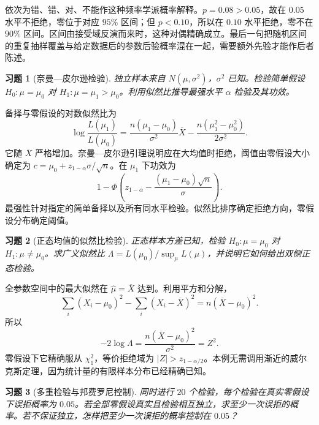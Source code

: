 \documentclass[UTF8,12pt,a4paper,fontset=fandol]{ctexart}
\newtheorem{exercise}{习题}[section]
\begin{document}
\begin{solve}\label{a:M-F-C10}依次为错、错、对、不能作这种频率学派概率解释。$p=0.08>0.05$，故在 $0.05$ 水平不拒绝，零位于对应 $95\%$ 区间；但 $p<0.10$，所以在 $0.10$ 水平拒绝，零不在 $90\%$ 区间。区间由接受域反演而来时，这种对偶精确成立。最后一句把随机区间的重复抽样覆盖与给定数据后的参数后验概率混在一起，需要额外先验才能作后者陈述。\end{solve}

\begin{exercise}[奈曼—皮尔逊检验]\label{q:B14.1}
独立样本来自 $N(\mu,\sigma^2)$，$\sigma^2$ 已知。检验简单假设 $H_0:\mu=\mu_0$ 对 $H_1:\mu=\mu_1>\mu_0$。利用似然比推导最强水平 $\alpha$ 检验及其功效。\par{}
\end{exercise}

\begin{solve}\label{a:B14.1}备择与零假设的对数似然比为\[\log\frac{L(\mu_1)}{L(\mu_0)}=\frac{n(\mu_1-\mu_0)}{\sigma^2}\overline X-\frac{n(\mu_1^2-\mu_0^2)}{2\sigma^2}.\]它随 $\overline X$ 严格增加。奈曼—皮尔逊引理说明应在大均值时拒绝，阈值由零假设大小确定为 $c=\mu_0+z_{1-\alpha}\sigma/\sqrt n$。在 $\mu_1$ 下功效为\[1-\Phi\left(z_{1-\alpha}-\frac{(\mu_1-\mu_0)\sqrt n}{\sigma}\right).\]最强性针对指定的简单备择以及所有同水平检验。似然比排序确定拒绝方向，零假设分布确定阈值。\end{solve}

\begin{exercise}[正态均值的似然比检验]\label{q:B14.2}
正态样本方差已知，检验 $H_0:\mu=\mu_0$ 对 $H_1:\mu\ne\mu_0$。求广义似然比 $\Lambda=L(\mu_0)/\sup_\mu L(\mu)$，并说明它如何给出双侧正态检验。\par{}
\end{exercise}

\begin{solve}\label{a:B14.2}全参数空间中的最大似然在 $\widehat\mu=\overline X$ 达到。利用平方和分解，\[\sum_i(X_i-\mu_0)^2-\sum_i(X_i-\overline X)^2=n(\overline X-\mu_0)^2.\]所以\[-2\log\Lambda=\frac{n(\overline X-\mu_0)^2}{\sigma^2}=Z^2.\]零假设下它精确服从 $\chi^2_1$，等价拒绝域为 $|Z|>z_{1-\alpha/2}$。本例无需调用渐近的威尔克斯定理，因为统计量的有限样本分布已经精确已知。\end{solve}

\begin{exercise}[多重检验与邦费罗尼控制]\label{q:B14.3}
同时进行 $20$ 个检验，每个检验在真实零假设下误拒概率为 $0.05$。若全部零假设真实且检验相互独立，求至少一次误拒的概率。若不保证独立，怎样把至少一次误拒的概率控制在 $0.05$？\par{}
\end{exercise}
\end{document}
